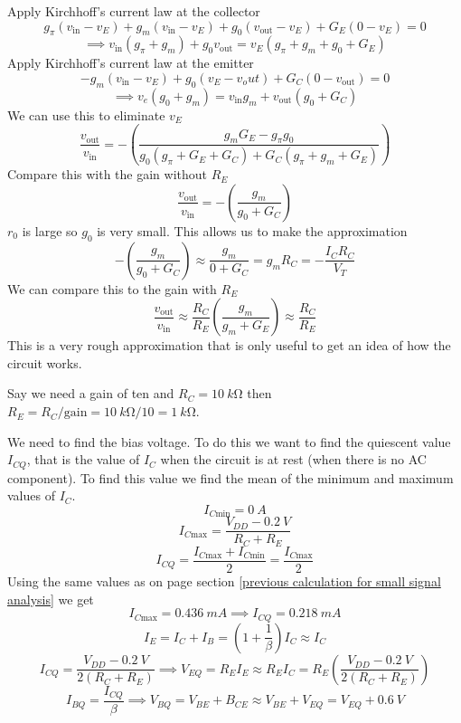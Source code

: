 \documentclass{article}
\begin{document}
    Apply Kirchhoff's current law at the collector
    \[g_\pi(v_\text{in} - v_E) + g_m(v_\text{in} - v_E) + g_0(v_\text{out} - v_E) + G_E(0 - v_E) = 0\]
    \[\implies v_\text{in}(g_\pi + g_m) + g_0v_\text{out} = v_E(g_\pi + g_m + g_0 + G_E)\]
    Apply Kirchhoff's current law at the emitter
    \[-g_m(v_\text{in} - v_E) + g_0(v_E - v_out) + G_C(0 - v_\text{out}) = 0\]
    \[\implies v_e(g_0 + g_m) = v_\text{in}g_m + v_\text{out}(g_0 + G_C)\]
    We can use this to eliminate \(v_E\)
    \begin{equation}\label{eqn:gain=-gm?(g0+GC)}
        \frac{v_\text{out}}{v_\text{in}} = -\left(\frac{g_mG_E - g_\pi g_0}{g_0(g_\pi + G_E + G_C) + G_C(g_\pi + g_m + G_E)}\right)
    \end{equation}
    Compare this with the gain without \(R_E\)
    \[\frac{v_\text{out}}{v_\text{in}} = -\left(\frac{g_m}{g_0 + G_C}\right)\]
    \(r_0\) is large so \(g_0\) is very small. This allows us to make the approximation
    \[-\left(\frac{g_m}{g_0 + G_C}\right)\approx\frac{g_m}{0 + G_C} = g_mR_C = -\frac{I_CR_C}{V_T}\]
    We can compare this to the gain with \(R_E\)
    \[\frac{v_\text{out}}{v_\text{in}} \approx \frac{R_C}{R_E}\left(\frac{g_m}{g_m + G_E}\right)\approx\frac{R_C}{R_E}\]
    This is a very rough approximation that is only useful to get an idea of how the circuit works.
    
    Say we need a gain of ten and \(R_C = \SI{10}{k\ohm}\) then \(R_E = R_C/\text{gain} = \SI{10}{k\ohm}/10 = \SI{1}{k\ohm}\).
    
    We need to find the bias voltage. 
    To do this we want to find the quiescent value \(I_{CQ}\), that is the value of \(I_C\) when the circuit is at rest (when there is no AC component).
    To find this value we find the mean of the minimum and maximum values of \(I_C\).
    \[I_{C\text{min}} = \SI{0}{A}\]
    \[I_{C\text{max}} = \frac{V_{DD} - \SI{0.2}{V}}{R_C + R_E}\]
    \[I_{CQ} = \frac{I_{C\text{max}} + I_{C\text{min}}}{2} = \frac{I_{C\text{max}}}{2}\]
    Using the same values as on page \pageref{previous calculation for small signal analysis} section \ref{previous calculation for small signal analysis} we get
    \[I_{C\text{max}} = \SI{0.436}{mA}\implies I_{CQ} = \SI{0.218}{mA}\]
    \[I_E = I_C + I_B = \left(1 + \frac{1}{\beta}\right)I_C\approx I_C\]
    \[I_{CQ} = \frac{V_{DD} - \SI{0.2}{V}}{2(R_C + R_E)}\implies V_{EQ} = R_EI_E\approx R_EI_C=R_E\left(\frac{V_{DD} - \SI{0.2}{V}}{2(R_C + R_E)}\right)\]
    \[I_{BQ} = \frac{I_{CQ}}{\beta}\implies V_{BQ} = V_{BE} + B_{CE}\approx V_{BE} + V_{EQ} = V_{EQ} + \SI{0.6}{V}\]
    
\end{document}
